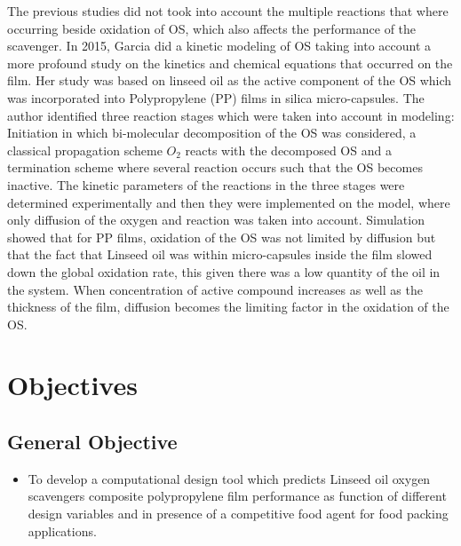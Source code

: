 \begin{refsection}
The previous studies did not took into account the multiple reactions that where occurring beside oxidation of OS, which also affects the performance of the scavenger. In 2015, Garcia \cite{GarciaMora2015KineticScavengers}  did a kinetic modeling of OS taking into account a more profound study on the kinetics and chemical equations that occurred on the film. Her study was based on linseed oil as the active component of the OS which was incorporated into Polypropylene (PP) films in silica micro-capsules. The author identified  three reaction stages which were taken into account in modeling: Initiation in which  bi-molecular decomposition of the OS was considered,  a classical propagation scheme $O_2$ reacts with the decomposed OS and a termination scheme where several reaction occurs such that the OS becomes inactive. The kinetic parameters of the reactions in the three stages were determined experimentally and then they were implemented on the model, where only diffusion of the oxygen and reaction was taken into account. Simulation showed that for PP films, oxidation of the OS was not limited by diffusion but that the fact that Linseed oil was within micro-capsules inside the film slowed down the global oxidation rate, this given there was a low quantity of the oil in the system. When concentration of active compound increases as well as the thickness of the film, diffusion becomes the limiting factor in the oxidation of the OS.

\section{Objectives}\label{sec:objectives}




\subsection{General Objective}
\begin{itemize}
    \item To develop a computational design tool which predicts Linseed oil oxygen scavengers composite polypropylene film performance as function of different design variables and in presence of a competitive food agent for food packing applications.
\end{itemize}


\end{refsection}
